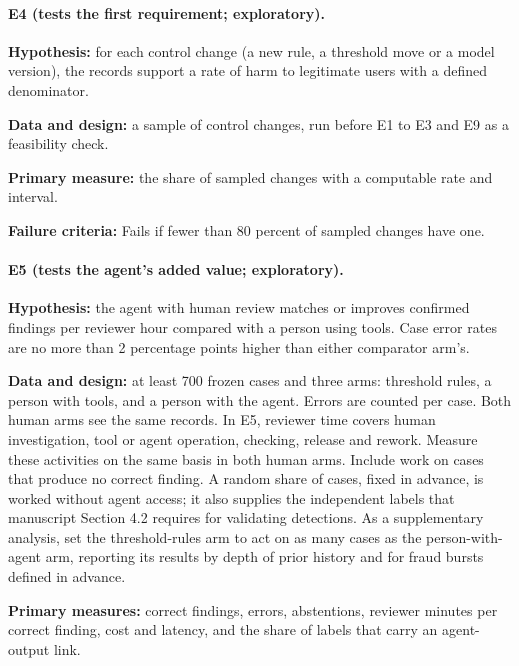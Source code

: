 \documentclass[
  11pt,
]{article}
\begin{document}
\hypertarget{e4-tests-the-first-requirement-exploratory.}{%
\paragraph{E4 (tests the first requirement;
exploratory).}\label{e4-tests-the-first-requirement-exploratory.}}

\textbf{Hypothesis:} for each control change (a new rule, a threshold
move or a model version), the records support a rate of harm to
legitimate users with a defined denominator.

\textbf{Data and design:} a sample of control changes, run before E1 to
E3 and E9 as a feasibility check.

\textbf{Primary measure:} the share of sampled changes with a computable
rate and interval.

\textbf{Failure criteria:} Fails if fewer than 80 percent of sampled
changes have one.

\hypertarget{e5-tests-the-agents-added-value-exploratory.}{%
\paragraph{E5 (tests the agent's added value;
exploratory).}\label{e5-tests-the-agents-added-value-exploratory.}}

\textbf{Hypothesis:} the agent with human review matches or improves
confirmed findings per reviewer hour compared with a person using tools.
Case error rates are no more than 2 percentage points higher than either
comparator arm's.

\textbf{Data and design:} at least 700 frozen cases and three arms:
threshold rules, a person with tools, and a person with the agent.
Errors are counted per case. Both human arms see the same records. In
E5, reviewer time covers human investigation, tool or agent operation,
checking, release and rework. Measure these activities on the same basis
in both human arms. Include work on cases that produce no correct
finding. A random share of cases, fixed in advance, is worked without
agent access; it also supplies the independent labels that manuscript
Section 4.2 requires for validating detections. As a supplementary
analysis, set the threshold-rules arm to act on as many cases as the
person-with-agent arm, reporting its results by depth of prior history
and for fraud bursts defined in advance.

\textbf{Primary measures:} correct findings, errors, abstentions,
reviewer minutes per correct finding, cost and latency, and the share of
labels that carry an agent-output link.
\end{document}
